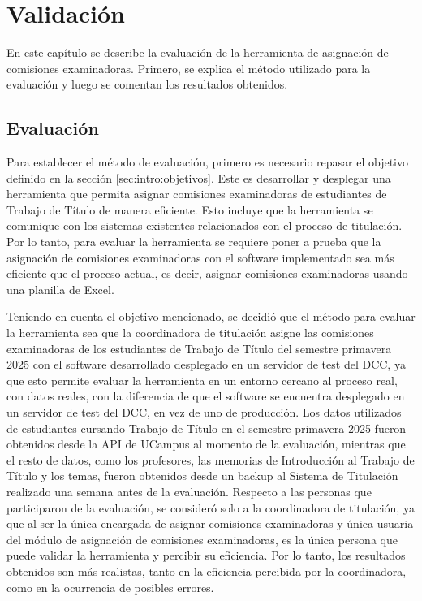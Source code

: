 \chapter{Validación}\label{cap:validacion}
En este capítulo se describe la evaluación de la herramienta de asignación de comisiones
examinadoras. Primero, se explica el método utilizado para la evaluación y luego se
comentan los resultados obtenidos.

\section{Evaluación}
Para establecer el método de evaluación, primero es necesario repasar el objetivo
definido en la sección \ref{sec:intro:objetivos}. Este es desarrollar y desplegar
una herramienta que permita asignar comisiones examinadoras de estudiantes de Trabajo de
Título de manera eficiente. Esto incluye que la herramienta se comunique con los sistemas
existentes relacionados con el proceso de titulación. Por lo tanto, para evaluar la
herramienta se requiere poner a prueba que la asignación de comisiones examinadoras
con el software implementado sea más eficiente que el proceso actual, es decir,
asignar comisiones examinadoras usando una planilla de Excel.

Teniendo en cuenta el objetivo mencionado, se decidió que el método para evaluar
la herramienta sea que la coordinadora de titulación asigne
las comisiones examinadoras de los estudiantes de Trabajo de Título del semestre
primavera 2025 con el software desarrollado desplegado en un servidor de test del DCC,
ya que esto permite evaluar la herramienta en un entorno cercano al proceso real, con
datos reales, con la diferencia de que el software se encuentra desplegado en un servidor
de test del DCC, en vez de uno de producción. Los datos utilizados de estudiantes cursando
Trabajo de Título en el semestre primavera 2025 fueron obtenidos desde la API de UCampus al
momento de la evaluación, mientras que el resto de datos, como los profesores, las memorias
de Introducción al Trabajo de Título y los temas, fueron obtenidos desde un backup al
Sistema de Titulación realizado una semana antes de la evaluación.
Respecto a las personas que participaron de la evaluación, se consideró solo a la
coordinadora de titulación, ya que al ser la única encargada de asignar comisiones
examinadoras y única usuaria del módulo de asignación de comisiones examinadoras,
es la única persona que puede validar la herramienta y percibir su eficiencia.
Por lo tanto, los resultados obtenidos son más realistas, tanto en la eficiencia
percibida por la coordinadora, como en la ocurrencia de  posibles errores.


